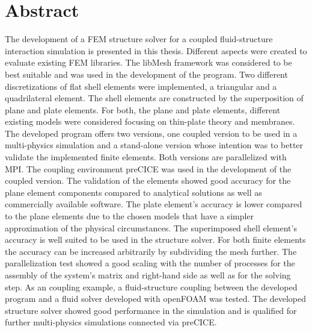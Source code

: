 \section*{Abstract}

The development of a FEM structure solver for a coupled fluid-structure interaction simulation is presented in this thesis. Different aspects were created to evaluate existing FEM libraries. The libMesh framework was considered to be best suitable and was used in the development of the program. Two different discretizations of flat shell elements were implemented, a triangular and a quadrilateral element. The shell elements are constructed by the superposition of plane and plate elements. For both, the plane and plate elements, different existing models were considered focusing on thin-plate theory and membranes. The developed program offers two versions, one coupled version to be used in a multi-physics simulation and a stand-alone version whose intention was to better validate the implemented finite elements. Both versions are parallelized with MPI. The coupling environment preCICE was used in the development of the coupled version. The validation of the elements showed good accuracy for the plane element components compared to analytical solutions as well as commercially available software. The plate element's accuracy is lower compared to the plane elements due to the chosen models that have a simpler approximation of the physical circumstances. The superimposed shell element's accuracy is well suited to be used in the structure solver. For both finite elements the accuracy can be increased arbitrarily by subdividing the mesh further. The parallelization test showed a good scaling with the number of processes for the assembly of the system's matrix and right-hand side as well as for the solving step. As an coupling example, a fluid-structure coupling between the developed program and a fluid solver developed with openFOAM was tested. The developed structure solver showed good performance in the simulation and is qualified for further multi-physics simulations connected via preCICE.
\newpage